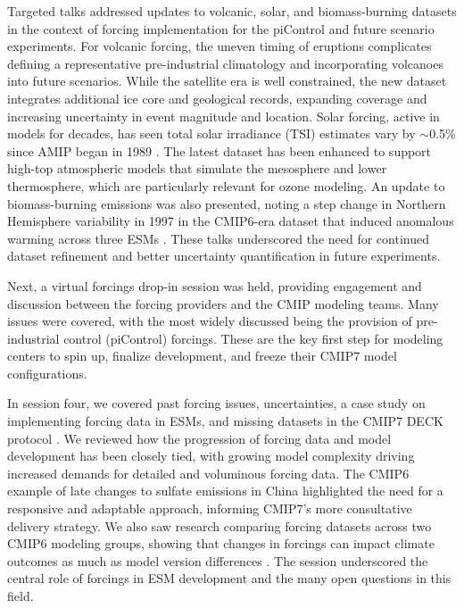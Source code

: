 \documentclass{ametsocV6.1}
\begin{document}
Targeted talks addressed updates to volcanic, solar, and biomass-burning datasets in the context of forcing implementation for the piControl and future scenario experiments. For volcanic forcing, the uneven timing of eruptions complicates defining a representative pre-industrial climatology and incorporating volcanoes into future scenarios. While the satellite era is well constrained, the new dataset integrates additional ice core and geological records, expanding coverage and increasing uncertainty in event magnitude and location. Solar forcing, active in models for decades, has seen total solar irradiance (TSI) estimates vary by $\sim$0.5\% since AMIP began in 1989 \citep{durack_coupled_2025}. The latest dataset has been enhanced to support high-top atmospheric models that simulate the mesosphere and lower thermosphere, which are particularly relevant for ozone modeling. An update to biomass-burning emissions was also presented, noting a step change in Northern Hemisphere variability in 1997 in the CMIP6-era dataset that induced anomalous warming across three ESMs \cite[e.g.,][]{fasullo_overview_2024,holland_new_2024}. These talks underscored the need for continued dataset refinement and better uncertainty quantification in future experiments.

Next, a virtual forcings drop-in session was held, providing engagement and discussion between the forcing providers and the CMIP modeling teams. Many issues were covered, with the most widely discussed being the provision of pre-industrial control (piControl) forcings. These are the key first step for modeling centers to spin up, finalize development, and freeze their CMIP7 model configurations.

In session four, we covered past forcing issues, uncertainties, a case study on implementing forcing data in ESMs, and missing datasets in the CMIP7 DECK protocol \citep{dunne_evolving_2024}. We reviewed how the progression of forcing data and model development has been closely tied, with growing model complexity driving increased demands for detailed and voluminous forcing data. The CMIP6 example of late changes to sulfate emissions in China highlighted the need for a responsive and adaptable approach, informing CMIP7’s more consultative delivery strategy. We also saw research comparing forcing datasets across two CMIP6 modeling groups, showing that changes in forcings can impact climate outcomes as much as model version differences \citep{fyfe_significant_2021,holland_new_2024}. The session underscored the central role of forcings in ESM development and the many open questions in this field.
\end{document}
